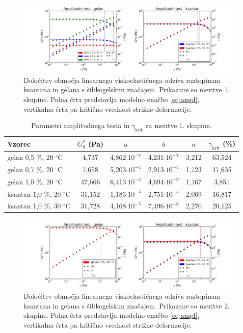\documentclass{article}
\begin{document}
\begin{figure}
  \centering
  \includegraphics[width=\linewidth]{S1ampl.png}
  \caption{Določitev območja linearnega viskoelastičnega odziva raztopinam ksantana in gelana s šibkogelskim značajem. Prikazane so meritve 1. skupine. Polna črta predstavlja modelno enačbo \ref{eq:ampl}, vertikalna črta pa kritično vrednost strižne deformacije.}
  \label{fig:ampl1}
\end{figure}

\renewcommand{\arraystretch}{1.5}
\begin{table}
\centering
\caption{Parametri amplitudnega testa in $\gamma_\mathrm{krit}$ za meritve 1. skupine.}
\label{tab:ampl1} 
\begin{tabular}{ l  c  c  c  c  c }
   
   \toprule
   Vzorec & $G^*_0$ (Pa) & $a$ & $b$ & $n$ & $\gamma_\mathrm{krit}$ (\%) \\ 
   \midrule
   gelan 0,5 \%, 20 $^\circ$C   & 4,737  & 4,862$\cdot10^{-7}$ & 4,231$\cdot10^{-7} $& 3,212 & 63,524 \\ 
   gelan 0,7 \%, 20 $^\circ$C   & 7,658  & 5,203$\cdot10^{-4}$ & 2,913$\cdot10^{-4} $& 1,723 & 17,635 \\
   gelan 1,0 \%, 20 $^\circ$C   & 47,666 & 6,413$\cdot10^{-3}$ & 4,694$\cdot10^{-9} $& 1,167 & 3,851 \\
   ksantan 1,0 \%, 20 $^\circ$C & 31,152 & 1,183$\cdot10^{-4}$ & 2,751$\cdot10^{-5} $& 2,069 & 16,817 \\
   ksantan 1,0 \%, 30 $^\circ$C & 31,728 & 4,168$\cdot10^{-5}$ & 7,496$\cdot10^{-6} $& 2,270 & 20,125 \\
   \bottomrule
\end{tabular}

\end{table}

\begin{figure}
  \centering
  \includegraphics[width=\linewidth]{S2ampl.png}
  \caption{Določitev območja linearnega viskoelastičnega odziva raztopinam ksantana in gelana s šibkogelskim značajem. Prikazane so meritve 2. skupine. Polna črta predstavlja modelno enačbo \ref{eq:ampl}, vertikalna črta pa kritično vrednost strižne deformacije.}
  \label{fig:ampl2}
\end{figure}
\end{document}
